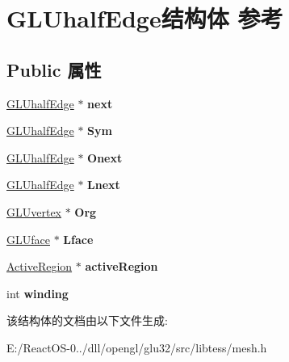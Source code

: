 \hypertarget{struct_g_l_uhalf_edge}{}\section{G\+L\+Uhalf\+Edge结构体 参考}
\label{struct_g_l_uhalf_edge}
\subsection*{Public 属性}
\begin{DoxyCompactItemize}
\item 
\mbox{\label{struct_g_l_uhalf_edge_ad980800cb7adfab3a1051f3db27c27b1}} 
\hyperlink{struct_g_l_uhalf_edge}{G\+L\+Uhalf\+Edge} $\ast$ {\bfseries next}
\item 
\mbox{\label{struct_g_l_uhalf_edge_ab6868bb77c0b768d03fce3faebed67b5}} 
\hyperlink{struct_g_l_uhalf_edge}{G\+L\+Uhalf\+Edge} $\ast$ {\bfseries Sym}
\item 
\mbox{\label{struct_g_l_uhalf_edge_a92430434a2eff852de6c5e768289877f}} 
\hyperlink{struct_g_l_uhalf_edge}{G\+L\+Uhalf\+Edge} $\ast$ {\bfseries Onext}
\item 
\mbox{\label{struct_g_l_uhalf_edge_a2765c254661d9246abae5b5c864e2879}} 
\hyperlink{struct_g_l_uhalf_edge}{G\+L\+Uhalf\+Edge} $\ast$ {\bfseries Lnext}
\item 
\mbox{\label{struct_g_l_uhalf_edge_a69ecc685c39d1c0541323f20f0841af6}} 
\hyperlink{struct_g_l_uvertex}{G\+L\+Uvertex} $\ast$ {\bfseries Org}
\item 
\mbox{\label{struct_g_l_uhalf_edge_aceab73b54e2bdd06a71bd6e452328699}} 
\hyperlink{struct_g_l_uface}{G\+L\+Uface} $\ast$ {\bfseries Lface}
\item 
\mbox{\label{struct_g_l_uhalf_edge_aadb1c59a9d5271c10dd65a45a67b90db}} 
\hyperlink{struct_active_region}{Active\+Region} $\ast$ {\bfseries active\+Region}
\item 
\mbox{\label{struct_g_l_uhalf_edge_adaa150e445ab56aa94ff8318f6c2661a}} 
int {\bfseries winding}
\end{DoxyCompactItemize}


该结构体的文档由以下文件生成\+:\begin{DoxyCompactItemize}
\item 
E\+:/\+React\+O\+S-\/0../dll/opengl/glu32/src/libtess/mesh.\+h\end{DoxyCompactItemize}
